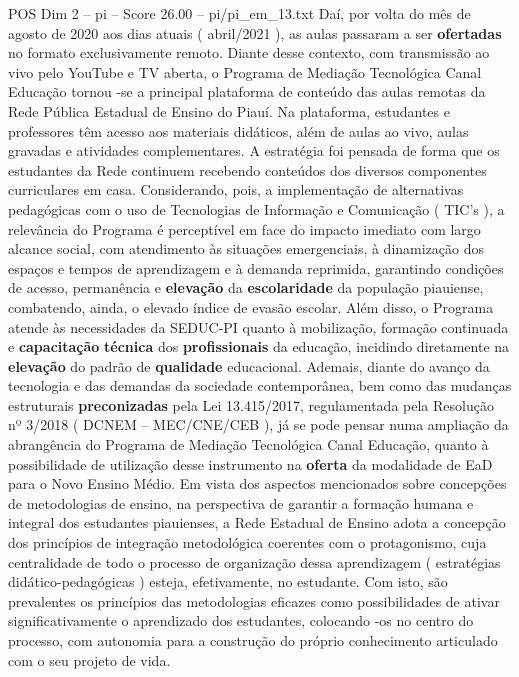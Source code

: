 \begin{textsample}{POS Dim 2 – pi – Score 26.00 – pi/pi\_em\_13.txt}
Daí, por volta do mês de agosto de 2020 aos dias atuais ( abril/2021 ), as aulas passaram a ser \textbf{ofertadas} no formato exclusivamente remoto.
Diante desse contexto, com transmissão ao vivo pelo YouTube e TV aberta, o Programa de Mediação Tecnológica Canal Educação tornou -se a principal plataforma de conteúdo das aulas remotas da Rede Pública Estadual de Ensino do Piauí.
Na plataforma, estudantes e professores têm acesso aos materiais didáticos, além de aulas ao vivo, aulas gravadas e atividades complementares.
A estratégia foi pensada de forma que os estudantes da Rede continuem recebendo conteúdos dos diversos componentes curriculares em casa.
Considerando, pois, a implementação de alternativas pedagógicas com o uso de Tecnologias de Informação e Comunicação ( TIC’s ), a relevância do Programa é perceptível em face do impacto imediato com largo alcance social, com atendimento às situações emergenciais, à dinamização dos espaços e tempos de aprendizagem e à demanda reprimida, garantindo condições de acesso, permanência e \textbf{elevação} da \textbf{escolaridade} da população piauiense, combatendo, ainda, o elevado índice de evasão escolar.
Além disso, o Programa atende às necessidades da SEDUC-PI quanto à mobilização, formação continuada e \textbf{capacitação} \textbf{técnica} dos \textbf{profissionais} da educação, incidindo diretamente na \textbf{elevação} do padrão de \textbf{qualidade} educacional.
Ademais, diante do avanço da tecnologia e das demandas da sociedade contemporânea, bem como das mudanças estruturais \textbf{preconizadas} pela Lei 13.415/2017, regulamentada pela Resolução nº 3/2018 ( DCNEM – MEC/CNE/CEB ), já se pode pensar numa ampliação da abrangência do Programa de Mediação Tecnológica Canal Educação, quanto à possibilidade de utilização desse instrumento na \textbf{oferta} da modalidade de EaD para o Novo Ensino Médio.
Em vista dos aspectos mencionados sobre concepções de metodologias de ensino, na perspectiva de garantir a formação humana e integral dos estudantes piauienses, a Rede Estadual de Ensino adota a concepção dos princípios de integração metodológica coerentes com o protagonismo, cuja centralidade de todo o processo de organização dessa aprendizagem ( estratégias didático-pedagógicas ) esteja, efetivamente, no estudante.
Com isto, são prevalentes os princípios das metodologias eficazes como possibilidades de ativar significativamente o aprendizado dos estudantes, colocando -os no centro do processo, com autonomia para a construção do próprio conhecimento articulado com o seu projeto de vida.

\end{textsample}
